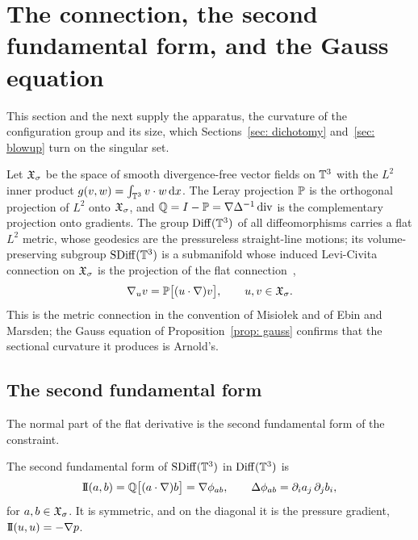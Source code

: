 \section{The connection, the second fundamental form, and the Gauss equation}
\label{sec: connection-curvature}

This section and the next supply the apparatus, the curvature of the
configuration group and its size, which Sections~\ref{sec: dichotomy}
and~\ref{sec: blowup} turn on the singular set.

Let $\mathfrak{X}_\sigma$ be the space of smooth divergence-free vector fields on $\mathbb{T}^3$ with
the $L^2$ inner product $g(v,w) = \int_{\mathbb{T}^3} v\cdot w\,\mathrm{d} x$. The Leray
projection $\mathbb{P}$ is the orthogonal projection of $L^2$ onto $\mathfrak{X}_\sigma$, and
$\mathbb{Q} = I - \mathbb{P} = \nabla\Delta^{-1}\operatorname{div}$ is the complementary projection
onto gradients. The group $\operatorname{Diff}(\mathbb{T}^3)$ of all diffeomorphisms carries a flat
$L^2$ metric, whose geodesics are the pressureless straight-line motions; its
volume-preserving subgroup $\operatorname{SDiff}(\mathbb{T}^3)$ is a submanifold whose induced
Levi-Civita connection on $\mathfrak{X}_\sigma$ is the projection of the flat
connection~\cite{ebin-1970-gro-dif-mot, misiolek-1993-sta-flo-ide,
arnold-1998-top-met-hyd},
\begin{equation}\label{eq: connection-2}
  \nabla_u v = \mathbb{P}\bigl[(u\cdot\nabla)v\bigr], \qquad u, v \in \mathfrak{X}_\sigma.
\end{equation}
This is the metric connection in the convention of Misio\l{}ek and of Ebin and
Marsden; the Gauss equation of Proposition~\ref{prop: gauss} confirms that the
sectional curvature it produces is Arnold's.

\subsection{The second fundamental form}

The normal part of the flat derivative is the second fundamental form of the
constraint.

\begin{lemma}\label{lem: second-fundamental}
The second fundamental form of $\operatorname{SDiff}(\mathbb{T}^3)$ in $\operatorname{Diff}(\mathbb{T}^3)$ is
\begin{equation}\label{eq: II}
  \mathrm{I\!I}(a,b) = \mathbb{Q}\bigl[(a\cdot\nabla)b\bigr] = \nabla\phi_{ab},
  \qquad \Delta\phi_{ab} = \partial_i a_j\,\partial_j b_i,
\end{equation}
for $a, b \in \mathfrak{X}_\sigma$. It is symmetric, and on the diagonal it is the pressure
gradient, $\mathrm{I\!I}(u,u) = -\nabla p$.
\end{lemma}


